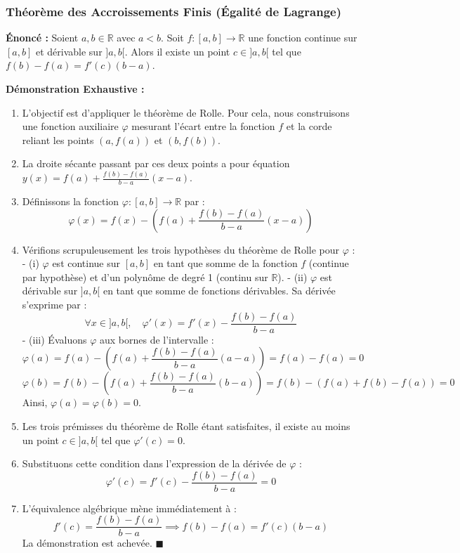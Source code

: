 \documentclass[11pt,a4paper]{article}
\begin{document}
\subsubsection*{Théorème des Accroissements Finis (Égalité de Lagrange)}
\textbf{Énoncé :} Soient $a, b \in \mathbb{R}$ avec $a < b$. Soit $f : [a, b] \to \mathbb{R}$ une fonction continue sur $[a, b]$ et dérivable sur $]a, b[$. Alors il existe un point $c \in ]a, b[$ tel que $f(b) - f(a) = f'(c)(b - a)$.

\textbf{Démonstration Exhaustive :}
\begin{enumerate}
\item L'objectif est d'appliquer le théorème de Rolle. Pour cela, nous construisons une fonction auxiliaire $\varphi$ mesurant l'écart entre la fonction $f$ et la corde reliant les points $(a, f(a))$ et $(b, f(b))$.
\item La droite sécante passant par ces deux points a pour équation $y(x) = f(a) + \frac{f(b) - f(a)}{b - a}(x - a)$.
\item Définissons la fonction $\varphi : [a, b] \to \mathbb{R}$ par :
   \[  \varphi(x) = f(x) - \left( f(a) + \frac{f(b) - f(a)}{b - a}(x - a) \right)  \]
\item Vérifions scrupuleusement les trois hypothèses du théorème de Rolle pour $\varphi$ :
   - (i) $\varphi$ est continue sur $[a, b]$ en tant que somme de la fonction $f$ (continue par hypothèse) et d'un polynôme de degré 1 (continu sur $\mathbb{R}$).
   - (ii) $\varphi$ est dérivable sur $]a, b[$ en tant que somme de fonctions dérivables. Sa dérivée s'exprime par :
     \[  \forall x \in ]a, b[, \quad \varphi'(x) = f'(x) - \frac{f(b) - f(a)}{b - a}  \]
   - (iii) Évaluons $\varphi$ aux bornes de l'intervalle :
     \[  \varphi(a) = f(a) - \left( f(a) + \frac{f(b) - f(a)}{b - a}(a - a) \right) = f(a) - f(a) = 0  \]
     \[  \varphi(b) = f(b) - \left( f(a) + \frac{f(b) - f(a)}{b - a}(b - a) \right) = f(b) - \left( f(a) + f(b) - f(a) \right) = 0  \]
     Ainsi, $\varphi(a) = \varphi(b) = 0$.
\item Les trois prémisses du théorème de Rolle étant satisfaites, il existe au moins un point $c \in ]a, b[$ tel que $\varphi'(c) = 0$.
\item Substituons cette condition dans l'expression de la dérivée de $\varphi$ :
   \[  \varphi'(c) = f'(c) - \frac{f(b) - f(a)}{b - a} = 0  \]
\item L'équivalence algébrique mène immédiatement à :
   \[  f'(c) = \frac{f(b) - f(a)}{b - a} \implies f(b) - f(a) = f'(c)(b - a)  \]
   La démonstration est achevée. $\blacksquare$
\end{enumerate}
\end{document}
